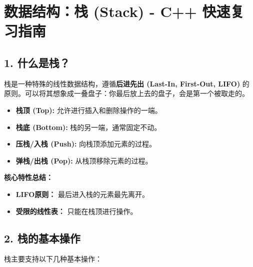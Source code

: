 \section{数据结构：栈 (Stack) - C++ 快速复习指南}

\subsection{1. 什么是栈？}

栈是一种特殊的线性数据结构，遵循\textbf{后进先出 (Last-In, First-Out, LIFO)} 的原则。可以将其想象成一叠盘子：你最后放上去的盘子，会是第一个被取走的。

\begin{itemize}
	\item \textbf{栈顶 (Top):} 允许进行插入和删除操作的一端。
	\item \textbf{栈底 (Bottom):} 栈的另一端，通常固定不动。
	\item \textbf{压栈/入栈 (Push):} 向栈顶添加元素的过程。
	\item \textbf{弹栈/出栈 (Pop):} 从栈顶移除元素的过程。
\end{itemize}

\textbf{核心特性总结：}

\begin{itemize}
	\item \textbf{LIFO原则：} 最后进入栈的元素最先离开。
	\item \textbf{受限的线性表：} 只能在栈顶进行操作。
\end{itemize}

\subsection{2. 栈的基本操作}

栈主要支持以下几种基本操作：

